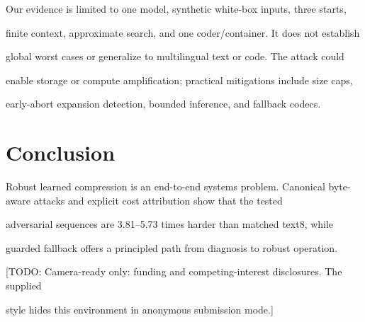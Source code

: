 \documentclass{article}
\newcommand{\todo}[1]{\textcolor{blueprint}{[TODO: #1]}}
\begin{document}
Our evidence is limited to one model, synthetic white-box inputs, three starts,

finite context, approximate search, and one coder/container. It does not establish

global worst cases or generalize to multilingual text or code. The attack could

enable storage or compute amplification; practical mitigations include size caps,

early-abort expansion detection, bounded inference, and fallback codecs.

\section{Conclusion}

Robust learned compression is an end-to-end systems problem. Canonical byte-aware attacks and explicit cost attribution show that the tested

adversarial sequences are 3.81--5.73 times harder than matched text8, while

guarded fallback offers a principled path from diagnosis to robust operation.

\begin{ack}

\todo{Camera-ready only: funding and competing-interest disclosures. The supplied

style hides this environment in anonymous submission mode.}

\end{ack}
\end{document}
